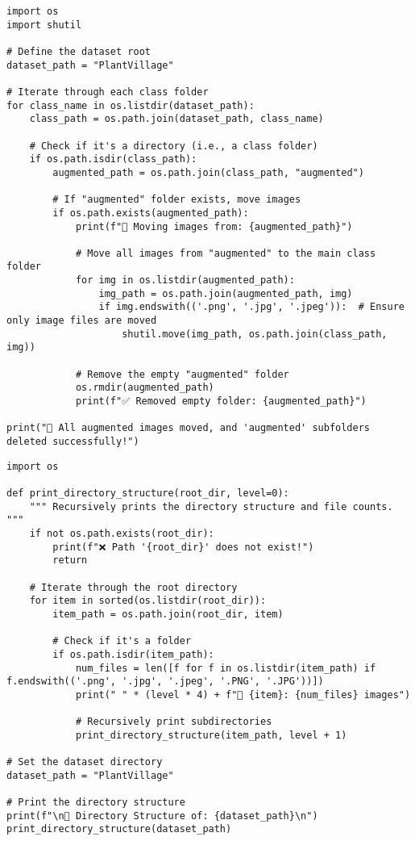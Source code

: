 \documentclass{article}
\begin{document}
\begin{lstlisting}

\end{lstlisting}
\begin{lstlisting}
import os
import shutil

# Define the dataset root
dataset_path = "PlantVillage"

# Iterate through each class folder
for class_name in os.listdir(dataset_path):
    class_path = os.path.join(dataset_path, class_name)

    # Check if it's a directory (i.e., a class folder)
    if os.path.isdir(class_path):
        augmented_path = os.path.join(class_path, "augmented")

        # If "augmented" folder exists, move images
        if os.path.exists(augmented_path):
            print(f"📂 Moving images from: {augmented_path}")

            # Move all images from "augmented" to the main class folder
            for img in os.listdir(augmented_path):
                img_path = os.path.join(augmented_path, img)
                if img.endswith(('.png', '.jpg', '.jpeg')):  # Ensure only image files are moved
                    shutil.move(img_path, os.path.join(class_path, img))

            # Remove the empty "augmented" folder
            os.rmdir(augmented_path)
            print(f"✅ Removed empty folder: {augmented_path}")

print("🎯 All augmented images moved, and 'augmented' subfolders deleted successfully!")
\end{lstlisting}
\begin{lstlisting}
import os

def print_directory_structure(root_dir, level=0):
    """ Recursively prints the directory structure and file counts. """
    if not os.path.exists(root_dir):
        print(f"❌ Path '{root_dir}' does not exist!")
        return

    # Iterate through the root directory
    for item in sorted(os.listdir(root_dir)):
        item_path = os.path.join(root_dir, item)

        # Check if it's a folder
        if os.path.isdir(item_path):
            num_files = len([f for f in os.listdir(item_path) if f.endswith(('.png', '.jpg', '.jpeg', '.PNG', '.JPG'))])
            print(" " * (level * 4) + f"📁 {item}: {num_files} images")

            # Recursively print subdirectories
            print_directory_structure(item_path, level + 1)

# Set the dataset directory
dataset_path = "PlantVillage"

# Print the directory structure
print(f"\n📂 Directory Structure of: {dataset_path}\n")
print_directory_structure(dataset_path)
\end{lstlisting}
\end{document}
